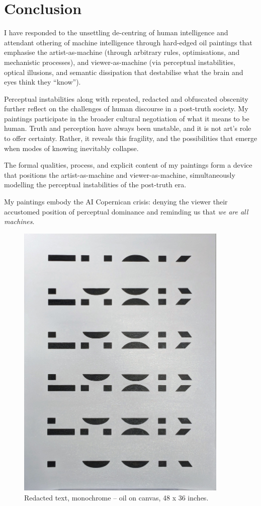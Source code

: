 \documentclass[12pt]{article}
\begin{document}
\section{Conclusion}
I have responded to the unsettling de-centring of human intelligence
and attendant othering of machine intelligence through hard-edged oil
paintings that emphasise the artist-as-machine (through
arbitrary rules, optimisations, and mechanistic processes), and
viewer-as-machine (via perceptual instabilities, optical illusions,
and semantic dissipation that destabilise what the brain and eyes
think they ``know'').

Perceptual instabilities along with repeated, redacted and obfuscated
obscenity further reflect on the challenges of human discourse in a
post-truth society. My paintings participate in the broader cultural
negotiation of what it means to be human. Truth and perception have
always been unstable, and it is not art's role to offer
certainty. Rather, it reveals this fragility, and the possibilities
that emerge when modes of knowing inevitably collapse.

The formal qualities, process, and explicit content of my paintings
form a device that positions the artist-as-machine and viewer-as-machine,
simultaneously modelling the perceptual instabilities of the
post-truth era.

My paintings embody the AI Copernican crisis:
denying the viewer their accustomed position of perceptual dominance
and reminding us that \emph{we are all machines}.

\newpage
\begin{figure}[htbp]
  \centering
  \includegraphics*[width=0.9\textwidth]{figures/black.jpg}
  \caption{Redacted text, monochrome -- oil on canvas, 48 x 36 inches.}
  \label{fig:black}
\end{figure}
\end{document}
